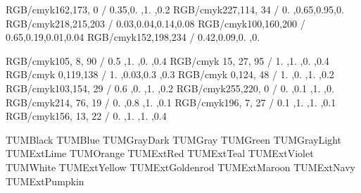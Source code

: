 \definecolor{TUMGreen}       {RGB/cmyk}{162,173,  0 / 0.35,0.  ,1.  ,0.2 }
\definecolor{TUMOrange}      {RGB/cmyk}{227,114, 34 / 0.  ,0.65,0.95,0.  }
\definecolor{TUMIvory}       {RGB/cmyk}{218,215,203 / 0.03,0.04,0.14,0.08}
\definecolor{TUMBlueLight}   {RGB/cmyk}{100,160,200 / 0.65,0.19,0.01,0.04}
\definecolor{TUMBlueLighter} {RGB/cmyk}{152,198,234 / 0.42,0.09,0.  ,0.  }

\definecolor{TUMExtViolet}   {RGB/cmyk}{105,  8, 90 / 0.5 ,1.  ,0.  ,0.4 }
\definecolor{TUMExtNavy}     {RGB/cmyk}{ 15, 27, 95 / 1.  ,1.  ,0.  ,0.4 }
\definecolor{TUMExtTeal}     {RGB/cmyk}{  0,119,138 / 1.  ,0.03,0.3 ,0.3 }
\definecolor{TUMExtForest}   {RGB/cmyk}{  0,124, 48 / 1.  ,0.  ,1.  ,0.2 }
\definecolor{TUMExtLime}     {RGB/cmyk}{103,154, 29 / 0.6 ,0.  ,1.  ,0.2 }
\definecolor{TUMExtYellow}   {RGB/cmyk}{255,220,  0 / 0.  ,0.1 ,1.  ,0.  }
\definecolor{TUMExtPumpkin}  {RGB/cmyk}{214, 76, 19 / 0.  ,0.8 ,1.  ,0.1 }
\definecolor{TUMExtRed}      {RGB/cmyk}{196,  7, 27 / 0.1 ,1.  ,1.  ,0.1 }
\definecolor{TUMExtMaroon}   {RGB/cmyk}{156, 13, 22 / 0.  ,1.  ,1.  ,0.4 }



      {TUMBlack}
       {TUMBlue}
   {TUMGrayDark}
       {TUMGray}
      {TUMGreen}
  {TUMGrayLight}
       {TUMExtLime}
     {TUMOrange}
        {TUMExtRed}
       {TUMExtTeal}
     {TUMExtViolet}
      {TUMWhite}
     {TUMExtYellow}
  {TUMExtGoldenrod}
     {TUMExtMaroon}
   {TUMExtNavy}
  {TUMExtPumpkin}


%
%
%
%
%
%
%
%
%
%
%


